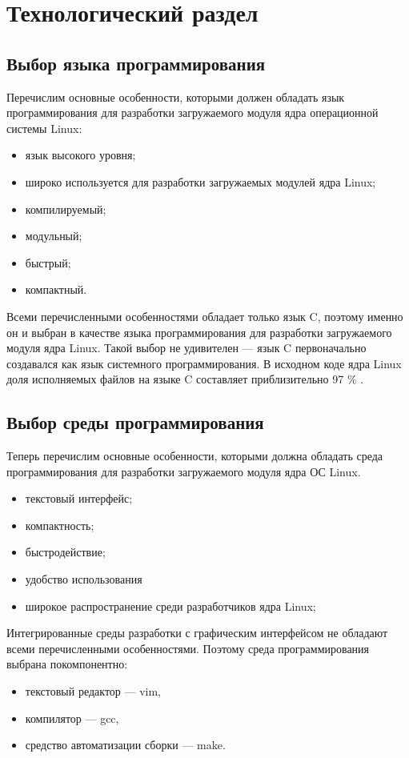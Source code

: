 \chapter{Технологический раздел}

\section{Выбор языка программирования}

Перечислим основные особенности, которыми должен обладать язык программирования для разработки загружаемого модуля ядра операционной системы Linux:
\begin{itemize}
	\item язык высокого уровня;
	\item широко используется для разработки загружаемых модулей ядра Linux;
	\item компилируемый;
	\item модульный;
	\item быстрый;
	\item компактный.
\end{itemize}

Всеми перечисленными особенностями обладает только язык C, поэтому именно он и выбран в качестве языка программирования для разработки загружаемого модуля ядра Linux.
Такой выбор не удивителен — язык C первоначально создавался как язык системного программирования.
В исходном коде ядра Linux доля исполняемых файлов на языке C составляет приблизительно 97 \% \cite{github-linux}.

\section{Выбор среды программирования}

Теперь перечислим основные особенности, которыми должна обладать среда программирования для разработки загружаемого модуля ядра ОС Linux.
\begin{itemize}
	\item текстовый интерфейс;
	\item компактность;
	\item быстродействие;
	\item удобство использования
	\item широкое распространение среди разработчиков ядра Linux;
\end{itemize}

Интегрированные среды разработки с графическим интерфейсом не обладают всеми перечисленными особенностями.
Поэтому среда программирования выбрана покомпонентно:
\begin{itemize}
	\item текстовый редактор — vim,
	\item компилятор — gcc,
	\item средство автоматизации сборки — make.
\end{itemize}

